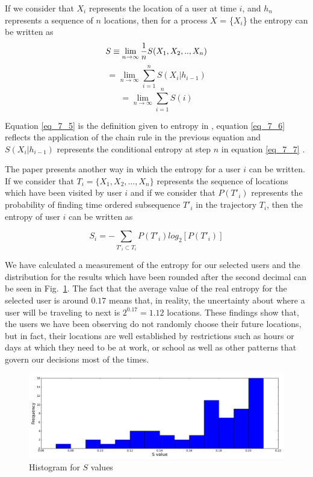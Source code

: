 If we consider that $X_{i}$ represents the location of a user at time $i$,
and $h_{n}$ represents a sequence of $n$ locations, then for a process $X$ =
\{$X_{i}$\} the entropy can be written as
\begin{equation}
\label{eq_7_5}
S \equiv \lim_{n\to\infty} {1 \over n}S(X_{1},X_{2},..,X_{n})
\end{equation} 
\begin{equation}
\label{eq_7_6}
= \lim_{n\to\infty} \sum\limits_{i=1}^{n} S(X_{i}|h_{i-1})
\end{equation}
\begin{equation}
\label{eq_7_7}
= \lim_{n\to\infty} \sum\limits_{i=1}^{n} S(i)
\end{equation}

Equation \ref{eq_7_5} is the definition given to entropy in
\cite{Cover:2006:EIT:1146355}, equation \ref{eq_7_6} reflects the application of
the chain rule in the previous equation and $S(X_{i}|h_{i-1})$ represents the
conditional entropy at step $n$ in equation \ref{eq_7_7} \cite{song2010limits}.

The paper \cite{Barabasi10} presents another way in which the entropy for a user
$i$ can be written. If we consider that $T_{i} = \{X_{1}, X_{2},\ldots, X_{n}\}$
represents the sequence of locations which have been visited by user $i$ and if
we consider that $P(T'_{i})$ represents the probability of finding time ordered
subsequence $T'_{i}$ in the trajectory $T_{i}$, then the entropy of user $i$ can
be written as

\begin{equation}
S_{i} = - \sum\limits_{T'_{i}\subset T_{i}}P(T'_{i})log_{2}[P(T'_{i})]
\end{equation}

We have calculated a measurement of the entropy for our selected users and the
distribution for the results which have been rounded after the second decimal
can be seen in Fig.~\ref{dis_full_e}. The fact that the average value of the
real entropy for the selected user is around $0.17$ means that, in reality, the
uncertainty about where a user will be traveling to next is $2^{0.17} = 1.12$
locations. These findings show that, the users we have been observing do not
randomly choose their future locations, but in fact, their locations are well
established by restrictions such as hours or days at which they need to be at
work, or school as well as other patterns that govern our decisions most of the
times.

\begin{figure}[!h]
\centering
\includegraphics[width=\textwidth]{figures/entro_pred/full_entro_distrib.png}
\caption{Histogram for $S$ values}
\label{dis_full_e}
\end{figure}

